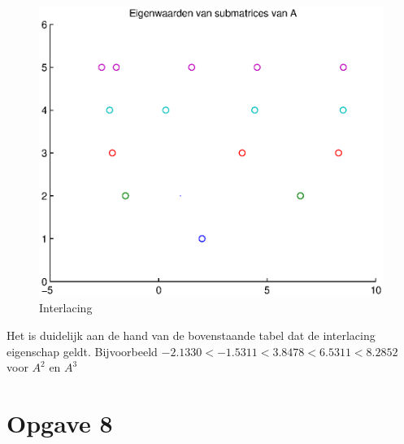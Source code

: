 \documentclass[]{article}
\newcommand{\opgave}[1]{\pagebreak\section*{Opgave #1}}
\begin{document}
\begin{figure}[h]
\noindent \includegraphics[width=1\linewidth]{opgave7.eps}
\caption{Interlacing}
\label{opgave71}
\end{figure}

\pagebreak 

\begin{table}[h]
\noindent{}
\caption{Eigenwaarden van de principiele submatrices van A}
\label{opgave72}
\end{table}

Het is duidelijk aan de hand van de bovenstaande tabel dat de interlacing eigenschap geldt. Bijvoorbeeld $-2.1330 < -1.5311 < 3.8478 < 6.5311 < 8.2852$ voor $A^{2}$ en $A^{3}$


\opgave{8}
\end{document}
